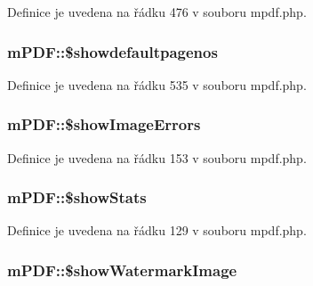Definice je uvedena na řádku 476 v souboru mpdf.\-php.

\hypertarget{classm_p_d_f_a068918ae074dae646fc0c41f7aea0769}{
\subsubsection[{\$showdefaultpagenos}]{\setlength{\rightskip}{0pt plus 5cm}m\-P\-D\-F\-::\$showdefaultpagenos}}\label{classm_p_d_f_a068918ae074dae646fc0c41f7aea0769}


Definice je uvedena na řádku 535 v souboru mpdf.\-php.

\hypertarget{classm_p_d_f_a05b0ef5956c10ad0acffa2d7e222acda}{
\subsubsection[{\$show\-Image\-Errors}]{\setlength{\rightskip}{0pt plus 5cm}m\-P\-D\-F\-::\$show\-Image\-Errors}}\label{classm_p_d_f_a05b0ef5956c10ad0acffa2d7e222acda}


Definice je uvedena na řádku 153 v souboru mpdf.\-php.

\hypertarget{classm_p_d_f_a753f090cebe967b5f06c850b66c9abc3}{
\subsubsection[{\$show\-Stats}]{\setlength{\rightskip}{0pt plus 5cm}m\-P\-D\-F\-::\$show\-Stats}}\label{classm_p_d_f_a753f090cebe967b5f06c850b66c9abc3}


Definice je uvedena na řádku 129 v souboru mpdf.\-php.

\hypertarget{classm_p_d_f_a53c3aa13e58cedf93e63400d6e596666}{
\subsubsection[{\$show\-Watermark\-Image}]{\setlength{\rightskip}{0pt plus 5cm}m\-P\-D\-F\-::\$show\-Watermark\-Image}}\label{classm_p_d_f_a53c3aa13e58cedf93e63400d6e596666}


